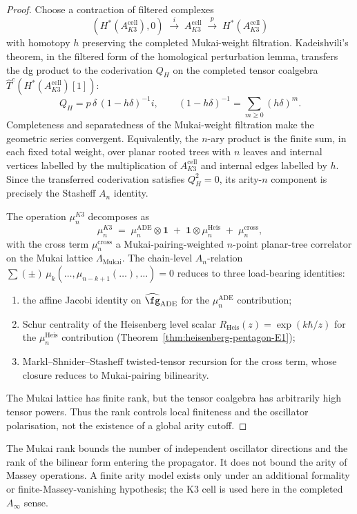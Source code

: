 \begin{proof}
Choose a contraction of filtered complexes
\[
 (H^*(A_{K3}^{\mathrm{cell}}),0)
 \;\xrightarrow{\ i\ }\;
 A_{K3}^{\mathrm{cell}}
 \;\xrightarrow{\ p\ }\;
 H^*(A_{K3}^{\mathrm{cell}})
\]
with homotopy $h$ preserving the completed Mukai-weight filtration.
Kadeishvili's theorem, in the filtered form of the homological
perturbation lemma, transfers the dg product to the coderivation
$Q_H$ on the completed tensor coalgebra
$\widehat{T}^{c}(H^*(A_{K3}^{\mathrm{cell}})[1])$:
\[
 Q_H
 =
 p\,\delta\,(1-h\delta)^{-1}i,
 \qquad
 (1-h\delta)^{-1}
 =
 \sum_{m\geq0}(h\delta)^m .
\]
Completeness and separatedness of the Mukai-weight filtration make the
geometric series convergent.  Equivalently, the $n$-ary product is the
finite sum, in each fixed total weight, over planar rooted trees with
$n$ leaves and internal vertices labelled by the multiplication of
$A_{K3}^{\mathrm{cell}}$ and internal edges labelled by $h$.
Since the transferred coderivation satisfies $Q_H^2=0$, its arity-$n$
component is precisely the Stasheff $A_n$ identity.

The operation $\mu_n^{K3}$ decomposes as
\[
 \mu_n^{K3}
 \;=\; \mu_n^{\mathrm{ADE}} \otimes \mathbf{1}
 \;+\; \mathbf{1} \otimes \mu_n^{\mathrm{Heis}}
 \;+\; \mu_n^{\mathrm{cross}},
\]
with the cross term $\mu_n^{\mathrm{cross}}$ a Mukai-pairing-weighted
$n$-point planar-tree correlator on the Mukai lattice
$\Lambda_{\mathrm{Mukai}}$. The chain-level $A_n$-relation
$\sum (\pm)\, \mu_k(\dots, \mu_{n - k + 1}(\dots), \dots) = 0$ reduces
to three load-bearing identities:
\begin{enumerate}
\item the affine Jacobi identity on $\widehat{\fg}_{\mathrm{ADE}}$ for
 the $\mu_n^{\mathrm{ADE}}$ contribution;
\item Schur centrality of the Heisenberg level scalar
 $R_{\mathrm{Heis}}(z) = \exp(k \hbar / z)$ for the
 $\mu_n^{\mathrm{Heis}}$ contribution
 \textup{(}Theorem~\ref{thm:heisenberg-pentagon-E1}\textup{);}
\item Markl--Shnider--Stasheff twisted-tensor recursion for the
 cross term, whose closure reduces to Mukai-pairing bilinearity.
\end{enumerate}
The Mukai lattice has finite rank, but the tensor coalgebra has
arbitrarily high tensor powers.  Thus the rank controls local
finiteness and the oscillator polarisation, not the existence of a
global arity cutoff.
\end{proof}

\begin{remark}
\label{rem:k3-Ainfty-shadow-class-arities}
The Mukai rank bounds the number of independent oscillator directions
and the rank of the bilinear form entering the propagator.  It does
not bound the arity of Massey operations.  A finite arity model exists
only under an additional formality or finite-Massey-vanishing
hypothesis; the K$3$ cell is used here in the completed
$A_\infty$ sense.
\end{remark}

